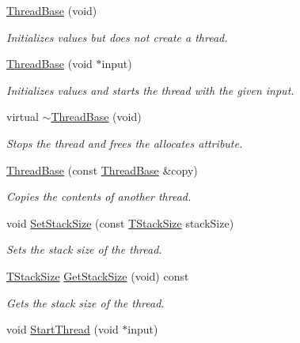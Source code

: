 \begin{DoxyCompactItemize}
\item 
\hyperlink{class_thread_base_a95aa3532d57d742e9591b37c4aff1bc7}{Thread\-Base} (void)
\begin{DoxyCompactList}\small\item\em Initializes values but does not create a thread. \end{DoxyCompactList}\item 
\hyperlink{class_thread_base_a9e152f859a8ae5a8d76672f0b53da5c7}{Thread\-Base} (void $\ast$input)
\begin{DoxyCompactList}\small\item\em Initializes values and starts the thread with the given input. \end{DoxyCompactList}\item 
virtual \hyperlink{class_thread_base_a4afe68df229298e2c2920d34ce612e0e}{$\sim$\-Thread\-Base} (void)
\begin{DoxyCompactList}\small\item\em Stops the thread and frees the allocates attribute. \end{DoxyCompactList}\item 
\hyperlink{class_thread_base_a50bd80044eb3845856abef9535f1903c}{Thread\-Base} (const \hyperlink{class_thread_base}{Thread\-Base} \&copy)
\begin{DoxyCompactList}\small\item\em Copies the contents of another thread. \end{DoxyCompactList}\item 
void \hyperlink{class_thread_base_add14648bdc8059dd8db41166130921dd}{Set\-Stack\-Size} (const \hyperlink{class_thread_base_af45bd74387b409e15989f7eddbaf3718}{T\-Stack\-Size} stack\-Size)
\begin{DoxyCompactList}\small\item\em Sets the stack size of the thread. \end{DoxyCompactList}\item 
\hyperlink{class_thread_base_af45bd74387b409e15989f7eddbaf3718}{T\-Stack\-Size} \hyperlink{class_thread_base_a39e2186d3cf4ddf6b9aa533d59f56546}{Get\-Stack\-Size} (void) const 
\begin{DoxyCompactList}\small\item\em Gets the stack size of the thread. \end{DoxyCompactList}\item 
void \hyperlink{class_thread_base_aaea6437d738ac97e3427bbe466f850f8}{Start\-Thread} (void $\ast$input)

\end{DoxyCompactItemize}
